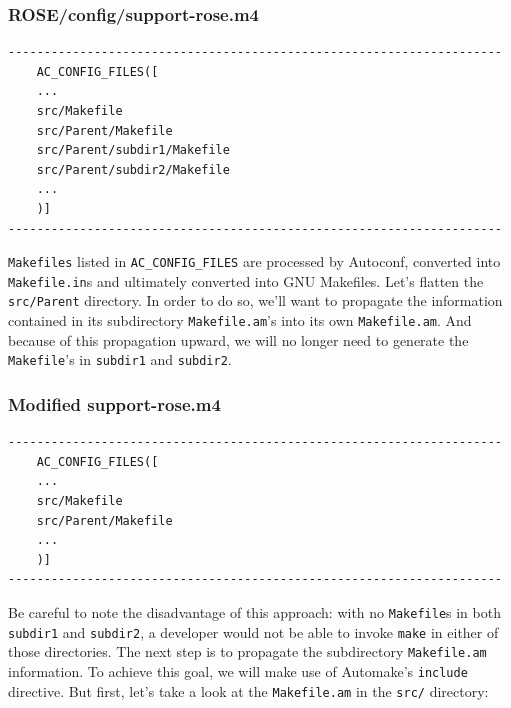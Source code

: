 \subsubsection{ROSE/config/support-rose.m4}
    \begin{verbatim}
---------------------------------------------------------------------
    AC_CONFIG_FILES([
    ...
    src/Makefile
    src/Parent/Makefile
    src/Parent/subdir1/Makefile
    src/Parent/subdir2/Makefile
    ...
    )]
---------------------------------------------------------------------
\end{verbatim}
\texttt{Makefiles} listed in \texttt{AC\_CONFIG\_FILES} are processed by Autoconf, converted
into \texttt{Makefile.in}s and ultimately converted into GNU Makefiles.
\newline\newline
Let's flatten the \texttt{src/Parent} directory. In order to do so, we'll want to propagate
the information contained in its subdirectory \texttt{Makefile.am}'s into
its own \texttt{Makefile.am}. And because of this propagation upward, we will no longer
need to generate the \texttt{Makefile}'s in \texttt{subdir1} and \texttt{subdir2}.
\subsubsection{Modified support-rose.m4}
    \begin{verbatim}
---------------------------------------------------------------------
    AC_CONFIG_FILES([
    ...
    src/Makefile
    src/Parent/Makefile
    ...
    )]
---------------------------------------------------------------------
\end{verbatim}
Be careful to note the disadvantage of this approach: with no \texttt{Makefile}s in both
\texttt{subdir1} and \texttt{subdir2}, a developer would not be able to invoke \texttt{make}
in either of those directories.
\newline\newline
The next step is to propagate the subdirectory \texttt{Makefile.am} information. To achieve
this goal, we will make use of Automake's \texttt{include} directive. But first, let's take
a look at the \texttt{Makefile.am} in the \texttt{src/} directory:



